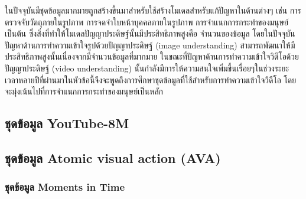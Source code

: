 ในปัจจุบันมีชุดข้อมูลมากมายถูกสร้างขึ้นมาสำหรับใช้สร้างโมเดลสำหรับแก้ปัญหาในด้านต่างๆ เช่น การตรวจจับวัตถุภายในรูปภาพ
การจดจำใบหน้าบุคคลภายในรูปภาพ การจำแนกการกระทำของมนุษย์ เป็นต้น ซึ่งสิ่งที่ทำให้โมเดลปัญญาประดิษฐ์นั้นมีประสิทธิภาพสูงคือ
จำนวนของข้อมูล โดยในปัจจุบันปัญหาด้านการทำความเข้าใจรูปด้วยปัญญาประดิษฐ์ (image understanding) 
สามารถพัฒนาให้มีประสิทธิภาพสูงนั้นเนื่องจากมีจำนวนข้อมูลที่มากมาย ในขณะที่ปัญหาด้านการทำความเข้าใจวิดีโอด้วยปัญญาประดิษฐ์ (video understanding) 
นั้นกำลังมีการให้ความสนใจเพิ่มขึ้นเรื่อยๆในช่วงระยะเวลาหลายปีที่ผ่านมาในหัวข้อนี้จึงจะพูดถึงการศึกษาชุดข้อมูลที่ใช้สำหรับการทำความเข้าใจวิดีโอ 
โดยจะมุ่งเน้นไปที่การจำแนกการกระทำของมนุษย์เป็นหลัก

\subsection*{ชุดข้อมูล YouTube-8M} 

\clearpage
\subsection*{ชุดข้อมูล Atomic visual action (AVA)}	

\clearpage
\subsubsection*{ชุดข้อมูล Moments in Time}
